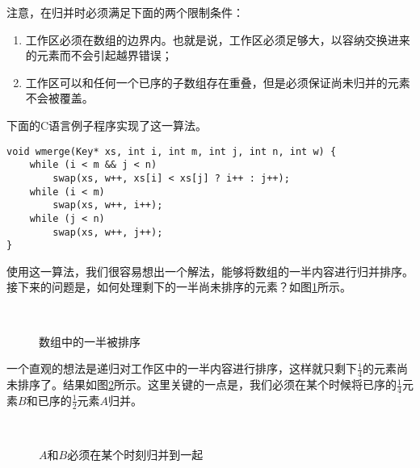 \documentclass[UTF8]{article}
\begin{document}
注意，在归并时必须满足下面的两个限制条件：

\begin{enumerate}
\item 工作区必须在数组的边界内。也就是说，工作区必须足够大，以容纳交换进来的元素而不会引起越界错误；
\item 工作区可以和任何一个已序的子数组存在重叠，但是必须保证尚未归并的元素不会被覆盖。
\end{enumerate}

下面的C语言例子程序实现了这一算法。

\lstset{language=C}
\begin{lstlisting}
void wmerge(Key* xs, int i, int m, int j, int n, int w) {
    while (i < m && j < n)
        swap(xs, w++, xs[i] < xs[j] ? i++ : j++);
    while (i < m)
        swap(xs, w++, i++);
    while (j < n)
        swap(xs, w++, j++);
}
\end{lstlisting}

使用这一算法，我们很容易想出一个解法，能够将数组的一半内容进行归并排序。接下来的问题是，如何处理剩下的一半尚未排序的元素？如图\ref{fig:merge-in-place-start}所示。

\begin{figure}[htbp]
 \centering
       \\
 \caption{数组中的一半被排序}
 \label{fig:merge-in-place-start}
\end{figure}

一个直观的想法是递归对工作区中的一半内容进行排序，这样就只剩下$\frac{1}{4}$的元素尚未排序了。结果如图\ref{fig:merge-in-place-quater}所示。这里关键的一点是，我们必须在某个时候将已序的$\frac{1}{4}$元素$B$和已序的$\frac{1}{2}$元素$A$归并。

\begin{figure}[htbp]
 \centering
       \\
 \caption{$A$和$B$必须在某个时刻归并到一起}
 \label{fig:merge-in-place-quater}
\end{figure}
\end{document}
